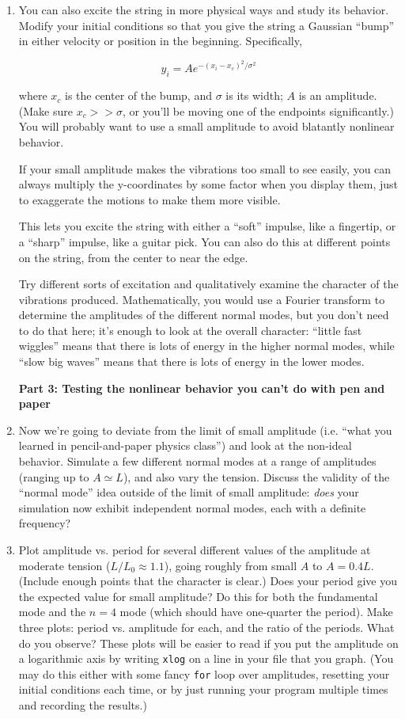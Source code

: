 \documentclass[12pt]{article}
\begin{document}
\begin{enumerate}
\item{You can also excite the string in more physical ways and study its behavior. Modify your initial conditions so that you give the string a Gaussian ``bump'' in either velocity or position in the beginning. Specifically,

   $$
    y_i = A e^{-(x_i-x_c)^2/\sigma^2}
    $$

   where $x_c$ is the center of the bump, and $\sigma$ is its width; $A$ is an amplitude. (Make sure $x_c >> \sigma$, or you'll be moving one of the endpoints significantly.) You will probably want to use a small amplitude to avoid blatantly nonlinear behavior.

   If your small amplitude makes the vibrations too small to see easily, you can always multiply the y-coordinates by some factor when you display them,
   just to exaggerate the motions to make them more visible.

    This lets you excite the string with either a ``soft'' impulse, like a fingertip, or a ``sharp'' impulse, like a guitar pick. You can also do this at different points on the string, from the center to near the edge.

    Try different sorts of excitation and qualitatively examine the character of the vibrations produced. Mathematically, you would use a Fourier transform to determine the amplitudes of the different normal modes, but you don't 
    need to do that here; it's enough to look at the overall character: ``little fast wiggles'' means that there is lots of energy in the higher normal modes, while ``slow big waves'' means that there is lots of energy in the lower modes.
  }

{\bf Part 3: Testing the nonlinear behavior you can't do with pen and paper}

\item{Now we're going to deviate from the limit of small amplitude (i.e. ``what you learned in pencil-and-paper physics class'') and look at the non-ideal behavior. Simulate a few different normal modes at a range of amplitudes (ranging up to $A \simeq L$), and also vary the tension.
Discuss the validity of the ``normal mode'' idea outside of the limit of small amplitude: {\it does} your simulation now exhibit independent normal modes, each with a definite frequency?}

\item{Plot amplitude vs. period for several different values of the amplitude at moderate tension ($L/L_0 \approx 1.1$), going roughly from small $A$ to $A=0.4L$. (Include enough points that the character is clear.) Does your period give you the expected value for small amplitude?
Do this for both the fundamental mode and the $n=4$ mode (which should have one-quarter the period). Make three plots: period vs. 
amplitude for each, and the ratio of the periods. What do you observe? These plots will be easier to read if you put the amplitude on a logarithmic axis by
writing {\tt xlog} on a line in your file that you graph. (You may do this either with some fancy {\tt for} loop over amplitudes, resetting your initial conditions each time, or by just running your program multiple times and recording the results.)}


\end{enumerate}
\end{document}
